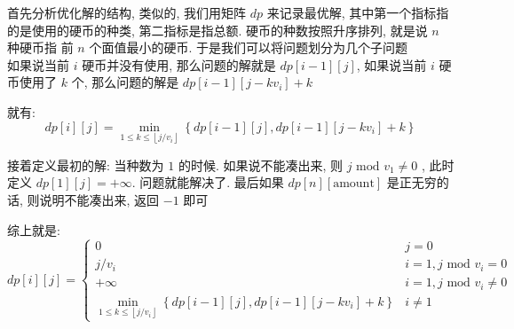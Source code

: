 \documentclass[a4paper, 10pt]{ctexart} %
\begin{document}
首先分析优化解的结构, 类似的, 我们用矩阵 $dp$ 来记录最优解, 其中第一个指标指的是使用的硬币的种类, 第二指标是指总额. 硬币的种数按照升序排列, 就是说 $n$ 种硬币指 前 $n$ 个面值最小的硬币.
于是我们可以将问题划分为几个子问题
\\ 如果说当前 $i$ 硬币并没有使用, 那么问题的解就是 $dp[i-1][j]$, 如果说当前 $i$ 硬币使用了 $k$ 个, 那么问题的解是 $dp[i-1][j-k v_i] + k$

就有: 
\[
dp[i][j] = \min_{1 \le k \le \left\lfloor j / v_i \right\rfloor} \left\{ dp [i-1]\left[ j \right], dp [i-1][j - k v_i] + k \right\}
\]

接着定义最初的解: 当种数为 $1$ 的时候. 如果说不能凑出来, 则 $j \text{ mod } v_1 \ne 0$ , 此时定义 $dp[1][j] = +\infty$. 
问题就能解决了. 最后如果 $dp [n][ \text{amount}]$ 是正无穷的话, 则说明不能凑出来, 返回 $-1$ 即可

综上就是:
\[
dp\left[ i \right]\left[ j \right] = 
\begin{cases}
    0 & j = 0\\
    \displaystyle j / v_i& i = 1, j \text{ mod } v_i = 0\\
    \displaystyle +\infty & i = 1, j \text{ mod } v_i \ne 0 \\
    \displaystyle \min _{1 \le k \le \left\lfloor j / v_i \right\rfloor} \left\{ dp \left[ i-1 \right] \left[ j \right] , dp \left[ i-1\right]\left[ j-k v_{i}   \right] +k\right\} & i \ne 1
\end{cases}
\]
\end{document}
